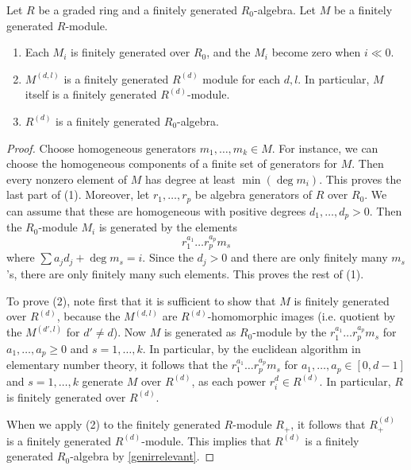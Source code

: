\begin{proposition} \label{duple preserves finiteness}
Let $R$ be a graded ring and a finitely generated $R_0$-algebra. Let $M$ be a
finitely generated $R$-module.
\begin{enumerate}
\item Each $M_i$ is finitely generated over $R_0$, and the $M_i$ become zero
when $i \ll
0$.
\item  $M^{(d,l)}$ is a finitely generated $R^{(d)}$ module for each $d,l$. In
particular, $M$ itself is a finitely generated $R^{(d)}$-module.
\item $R^{(d)}$ is a finitely generated $R_0$-algebra.
\end{enumerate}
\end{proposition} 
\begin{proof} 
Choose homogeneous generators $m_1, \dots, m_k \in M$.
For instance, we can choose the homogeneous components of a finite set of
generators for $M$.
Then every nonzero
element of $M$ has degree at least $\min(\deg m_i)$.  This proves the
last part of (1). Moreover, let $r_1, \dots, r_p$ be algebra generators of $R$ over
$R_0$.
We can assume that these are homogeneous with positive degrees $d_1, \dots,
d_p>0$.
Then the $R_0$-module $M_i$ is generated by the elements
\[  r_1^{a_1} \dots r_p^{a_p} m_s  \]
where $\sum a_j d_j + \deg m_s = i$.  Since the $d_j>0$ and there are only
finitely many $m_s$'s, there are only finitely many such elements. This proves
the rest of (1).

To prove (2), note first that it is sufficient to show that $M$ is finitely
generated over $R^{(d)}$, because the $M^{(d,l)}$ are $R^{(d)}$-homomorphic
images (i.e. quotient by the $M^{(d', l)}$ for $d' \neq d$).
Now $M$ is generated as $R_0$-module by the $r_1^{a_1} \dots r_p^{a_p} m_s $
for $a_1, \dots, a_p \geq 0$ and $s = 1, \dots,  k$.
In particular, by the euclidean algorithm in elementary number theory, it
follows that the 
$r_1^{a_1} \dots r_p^{a_p} m_s $
for $a_1, \dots, a_p \in [0, d-1]$ and $s = 1, \dots,  k$ generate $M$ over
$R^{(d)}$, as each power $r_i^{d} \in R^{(d)}$.
In particular, $R$ is finitely generated over $R^{(d)}$.

When we apply (2) to the finitely generated $R$-module $R_+$, it follows that
$R^{(d)}_+$ is a finitely generated
$R^{(d)}$-module. This implies that $R^{(d)}$ is a finitely generated
$R_0$-algebra by \cref{genirrelevant}.
\end{proof}

